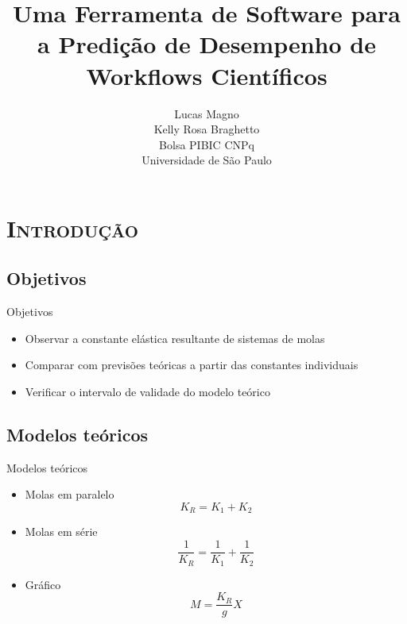 \documentclass[xcolor=x11names,compress]{beamer}
\date{}
\renewcommand{\(}{\begin{columns}}
\renewcommand{\)}{\end{columns}}
\newcommand{\<}[1]{\begin{column}{#1}}
\renewcommand{\>}{\end{column}}
\begin{document}
\begin{frame}
    \title{\LARGE Uma Ferramenta de Software para a Predição de Desempenho
    de Workflows Científicos}
    \author{
        Lucas Magno\\
        Kelly Rosa Braghetto \\[1.5cm]
        Bolsa PIBIC CNPq\\[0.2cm]
        Universidade de São Paulo
    }
    \titlepage
\end{frame}

\section{\scshape Introdução}



\subsection{Objetivos}

\begin{frame}{Objetivos}
    \begin{itemize}
        \item Observar a constante elástica resultante de sistemas de molas
        \item Comparar com previsões teóricas a partir das constantes individuais
        \item Verificar o intervalo de validade do modelo teórico
    \end{itemize}
\end{frame}



\subsection{Modelos teóricos}

\begin{frame}{Modelos teóricos}
    \begin{itemize}
        \item Molas em paralelo
            \[ K_{R} = K_{1}+K_{2}\]
        \item Molas em série
            \[ \frac{1}{K_{R}} = \frac{1}{K_{1}} + \frac{1}{K_{2}} \]
        \item Gráfico
            \[M = \frac{K_{R}}{g}X\]
    \end{itemize}
\end{frame}
\end{document}
